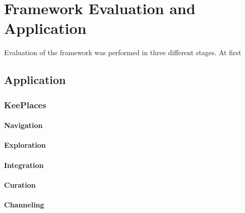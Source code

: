 \chapter{Framework Evaluation and Application}
\label{chapter:application}

Evaluation of the framework was performed in three different stages. At first  

{\section{Application}

{\subsection{KeePlaces}

{\subsubsection{Navigation}}
{\subsubsection{Exploration}}
{\subsubsection{Integration}}
{\subsubsection{Curation}}
{\subsubsection{Channeling}}

} %
} %



